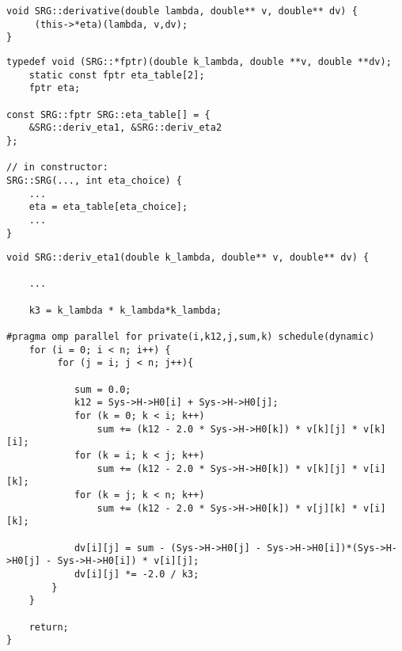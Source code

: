 \begin{lstlisting}[float,caption={The function \textit{oscillator\_derivative} serves as a wrapper, picking the generator-specific derivative-computing function from an array. All functions in this array must have the same signature as in Eq. (\ref{eq:devfunction}). Here \textit{lambda} denotes the integration point, and \textit{v} and \textit{dv} are arrays containing the interaction elements and corresponding derivatives, respectively. },numbers=none, label={lst:eta0}]
void SRG::derivative(double lambda, double** v, double** dv) {
     (this->*eta)(lambda, v,dv);
}
\end{lstlisting}

\begin{lstlisting}[float,caption={Demonstration how we practically implemented the array containing the derivative-functions \textit{deriv\_eta1} and \textit{deriv\_eta2} for two different generators. When an instance of the class \textit{SRG} is created, the integer \textit{eta\_choice} determines which of the functions shall be used when \textit{oscillator\_derivative} is called.},numbers=none, label={lst:eta1}]
typedef void (SRG::*fptr)(double k_lambda, double **v, double **dv);
    static const fptr eta_table[2];
    fptr eta;
    
const SRG::fptr SRG::eta_table[] = {
    &SRG::deriv_eta1, &SRG::deriv_eta2
};

// in constructor:
SRG::SRG(..., int eta_choice) {
    ...
    eta = eta_table[eta_choice];
    ...
}
\end{lstlisting}


\begin{lstlisting}[float,caption={Derivative function for generator $\hat{\eta}_1$. The function receives the current interaction elements at \textit{k\_lambda} in the array  \textit{v} and returns the corresponding derivatives in the \mbox{array \textit{dv}}. The calculation is performed according to Eq.~(\ref{eq:flow}). Via the object \textit{Sys} of type \textit{System}, the Hamiltonian can effectively be accessed.}, label={lst:eta2}]
void SRG::deriv_eta1(double k_lambda, double** v, double** dv) {

	...
	
    k3 = k_lambda * k_lambda*k_lambda;

#pragma omp parallel for private(i,k12,j,sum,k) schedule(dynamic)
    for (i = 0; i < n; i++) {
         for (j = i; j < n; j++){
             
            sum = 0.0;
            k12 = Sys->H->H0[i] + Sys->H->H0[j];
            for (k = 0; k < i; k++)
                sum += (k12 - 2.0 * Sys->H->H0[k]) * v[k][j] * v[k][i];
            for (k = i; k < j; k++)
                sum += (k12 - 2.0 * Sys->H->H0[k]) * v[k][j] * v[i][k];
            for (k = j; k < n; k++)
                sum += (k12 - 2.0 * Sys->H->H0[k]) * v[j][k] * v[i][k];

            dv[i][j] = sum - (Sys->H->H0[j] - Sys->H->H0[i])*(Sys->H->H0[j] - Sys->H->H0[i]) * v[i][j];
            dv[i][j] *= -2.0 / k3;
        }
    }
    
    return;
}
\end{lstlisting}


